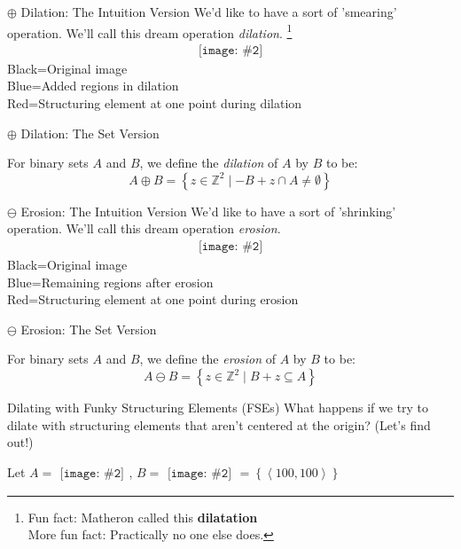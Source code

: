 \documentclass{beamer}
\newcommand{\pic}[2]{
     \begin{array}{l}
      \texttt{[image: \#2]}
      \end{array}
}
\newcommand{\set}[1]{\left\lbrace #1 \right\rbrace}
\newcommand{\buildset}[2]{\set{#1 \mid #2}}
\newcommand{\tuple}[1]{\left\langle #1 \right\rangle}
\newcommand{\intersect}{\cap}
\newcommand{\dilate}{\oplus}
\newcommand{\erode}{\ominus}
\begin{document}
\begin{frame}{$\dilate$ Dilation: The Intuition Version}
  We'd like to have a sort of 'smearing' operation. 
  We'll call this dream operation \emph{dilation}.
  \footnote{Fun fact: Matheron called this \textbf{dilatation}\\
            More fun fact: Practically no one else does.}
    $$\pic{width=100pt}{images/dilation_example.png}$$
      Black=Original image\\
      Blue=Added regions in dilation\\
      Red=Structuring element at one point during dilation
\end{frame}

\begin{frame}{$\dilate$ Dilation: The Set Version}
  \begin{definition}
    For binary sets $A$ and $B$, we define the \emph{dilation} of $A$ by $B$
    to be:
    $$A \dilate B = \buildset{z \in \mathbb{Z}^2}
                             {-B+z \intersect A \not= \emptyset}$$
  \end{definition}
  
\end{frame}
\begin{frame}{$\erode$ Erosion: The Intuition Version}
  We'd like to have a sort of 'shrinking' operation. 
  We'll call this dream operation \emph{erosion}.
    $$\pic{width=100pt}{images/erosion_example.png}$$
      Black=Original image\\
       Blue=Remaining regions after erosion\\
       Red=Structuring element at one point during erosion
 
\end{frame}

\begin{frame}{$\erode$ Erosion: The Set Version}
   \begin{definition}
    For binary sets $A$ and $B$, we define the \emph{erosion} of 
    $A$ by $B$ to be:
    $$A \erode B=\buildset{z \in \mathbb{Z}^2}{B+z \subseteq A}$$
  \end{definition}
 
\end{frame}
\begin{frame}{Dilating with Funky Structuring Elements (FSEs)}
  What happens if we try to dilate with structuring elements that aren't
  centered at the origin? (Let's find out!)

  Let $A = \pic{width=50pt}{images/binarycoolhamblen.png}$,
      $B = \pic{width=50pt}{images/fse.png}=
           \set{\tuple{100,100}}$

\end{frame}
\end{document}
